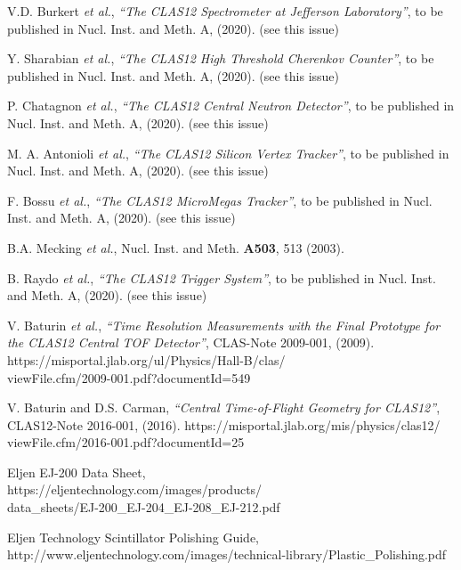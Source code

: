 \documentclass[3p,times,twocolumn]{elsarticle}
\begin{document}
\begin{thebibliography}{99}

V.D. Burkert {\it et al.}, {\it ``The CLAS12 Spectrometer at Jefferson Laboratory''}, to be published in Nucl.
Inst. and Meth. A, (2020). (see this issue)

Y. Sharabian {\it et al.}, {\it ``The CLAS12 High Threshold Cherenkov Counter''}, to be published in Nucl.
Inst. and Meth. A, (2020). (see this issue)
  
P. Chatagnon {\it et al.}, {\it ``The CLAS12 Central Neutron Detector''}, to be published in Nucl. Inst.
and Meth. A, (2020). (see this issue)
  
M. A. Antonioli {\it et al.}, {\it ``The CLAS12 Silicon Vertex Tracker''}, to be published in Nucl. Inst.
and Meth. A, (2020). (see this issue)

F. Bossu {\it et al.}, {\it ``The CLAS12 MicroMegas Tracker''}, to be published in Nucl. Inst.
and Meth. A, (2020). (see this issue)
  
B.A. Mecking {\it et al.}, Nucl. Inst. and Meth. {\bf A503}, 513 (2003).

B. Raydo {\it et al.}, {\it ``The CLAS12 Trigger System''}, to be published in Nucl. Inst. and Meth. A, (2020).
(see this issue)

V. Baturin {\it et al.}, {\it ``Time Resolution Measurements with the Final Prototype for the 
CLAS12 Central TOF Detector''}, CLAS-Note 2009-001, (2009).\\
https://misportal.jlab.org/ul/Physics/Hall-B/clas/\\ viewFile.cfm/2009-001.pdf?documentId=549

V. Baturin and D.S. Carman, {\it ``Central Time-of-Flight Geometry for CLAS12''}, CLAS12-Note 
2016-001, (2016).
https://misportal.jlab.org/mis/physics/clas12/\\ viewFile.cfm/2016-001.pdf?documentId=25

Eljen EJ-200 Data Sheet,\\
https://eljentechnology.com/images/products/\\
data\_sheets/EJ-200\_EJ-204\_EJ-208\_EJ-212.pdf

Eljen Technology Scintillator Polishing Guide,\\
http://www.eljentechnology.com/images/technical-library/Plastic\_Polishing.pdf


\end{thebibliography}
\end{document}
